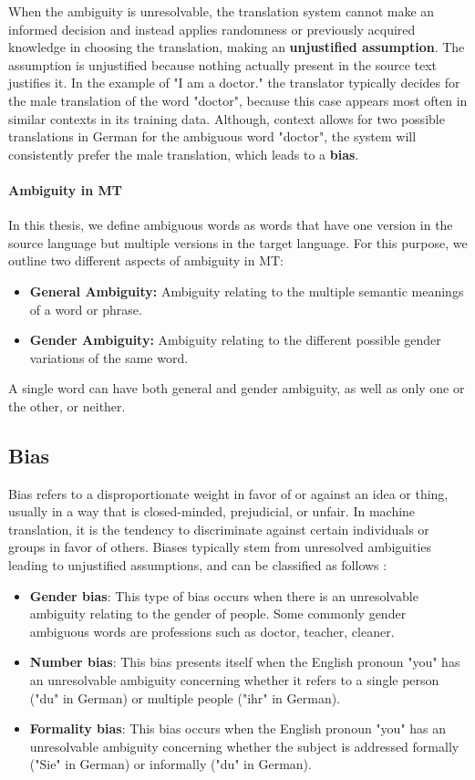 When the ambiguity is unresolvable, the translation system cannot make an informed decision and instead applies randomness or previously acquired knowledge in choosing the translation, making an \textbf{unjustified assumption}. The assumption is unjustified because nothing actually present in the source text justifies it. In the example of "I am a doctor." the translator typically decides for the male translation of the word "doctor", because this case appears most often in similar contexts in its training data. Although, context allows for two possible translations in German for the ambiguous word "doctor", the system will consistently prefer the male translation, which leads to a \textbf{bias}. 

\paragraph{Ambiguity in MT}
In this thesis, we define ambiguous words as words that have one version in the source language but multiple versions in the target language. For this purpose, we outline two different aspects of ambiguity in MT:
\begin{itemize}
    \item \textbf{General Ambiguity:} Ambiguity relating to the multiple semantic meanings of a word or phrase.
    \item \textbf{Gender Ambiguity:} Ambiguity relating to the different possible gender variations of the same word.
\end{itemize}
A single word can have both general and gender ambiguity, as well as only one or the other, or neither.

\subsection{Bias}
\label{sec:Background:Bias}
Bias refers to a disproportionate weight in favor of or against an idea or thing, usually in a way that is closed-minded, prejudicial, or unfair. In machine translation, it is the tendency to discriminate against certain individuals or groups in favor of others. Biases typically stem from unresolved ambiguities leading to unjustified assumptions, and can be classified as follows \parencite{bias_taxonomy}:
\begin{itemize}
    \item \textbf{Gender bias}: This type of bias occurs when there is an unresolvable ambiguity relating to the gender of people. Some commonly gender ambiguous words are professions such as doctor, teacher, cleaner. 
    \item \textbf{Number bias}: This bias presents itself when the English pronoun "you" has an unresolvable ambiguity concerning whether it refers to a single person ("du" in German) or multiple people ("ihr" in German). 
    \item \textbf{Formality bias}: This bias occurs when the English pronoun "you" has an unresolvable ambiguity concerning whether the subject is addressed formally ("Sie" in German) or informally ("du" in German). 
\end{itemize}

